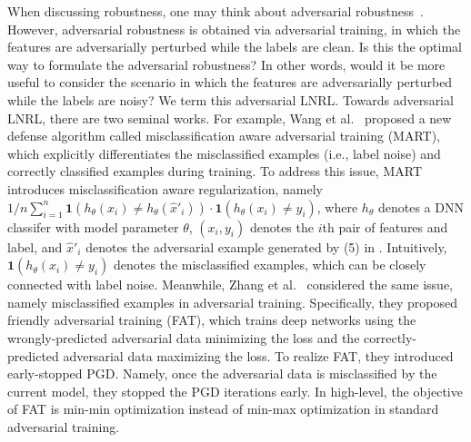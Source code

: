 When discussing robustness, 
one may think about adversarial robustness~. 
However, adversarial robustness is obtained via adversarial training, in which the features are adversarially perturbed while the labels are clean. 
Is this the optimal way to formulate the adversarial robustness? In other words, would it be more useful to consider the scenario in which the features are adversarially perturbed while the labels are noisy? We term this adversarial LNRL.
Towards adversarial LNRL, there are two seminal works. For example, Wang et al.~ proposed a new defense algorithm called misclassification aware adversarial training (MART), which explicitly differentiates the misclassified examples (i.e., label noise) and correctly classified examples during  training. To address this issue, MART introduces misclassification aware regularization, namely $1/n\sum_{i=1}^{n}\mathbf{1}(h_{\theta}(x_i)\neq h_{\theta}(\hat{x}'_i))\cdot\mathbf{1}(h_{\theta}(x_i)\neq y_i)$, where $h_{\theta}$ denotes a DNN classifer with model parameter $\theta$, $(x_i, y_i) $ denotes the $i$th pair of features and label, and $\hat{x}'_i$ denotes the adversarial example generated by (5) in . Intuitively, $\mathbf{1}(h_{\theta}(x_i)\neq y_i)$ denotes the misclassified examples, which can be closely connected with label noise. Meanwhile, Zhang et al.~ considered the same issue, namely misclassified examples in adversarial training. Specifically, they proposed friendly adversarial training (FAT), which trains deep networks using the wrongly-predicted adversarial data minimizing the loss and the correctly-predicted adversarial data maximizing the loss. To realize FAT, they introduced early-stopped PGD. Namely, once the adversarial data is misclassified by the current model, they  stopped the PGD iterations early. In high-level, the objective of FAT is min-min optimization instead of min-max optimization in standard adversarial training.

